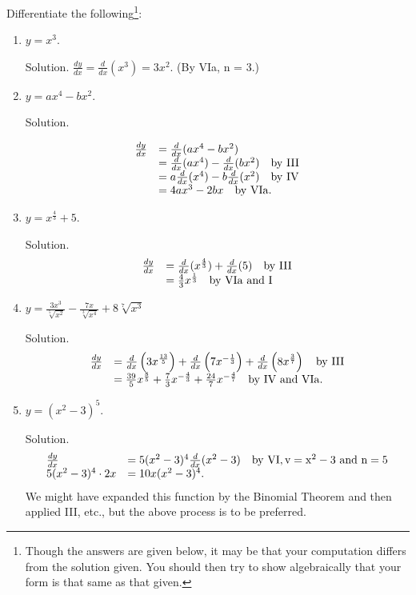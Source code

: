Differentiate the following\footnote{Though the answers are given 
below, it may be that your computation differs from the solution given.
You should then try to show algebraically that your form is that same 
as that given.}: %

\begin{enumerate}
\item
$y = x^3$.

Solution. $\frac{dy}{dx} = \frac{d}{dx}(x^3) = 3x^2$. 
(By VIa, n = 3.)

\item
$y = ax^4 - bx^2$.

Solution. 

\[
\begin{array}{ll}
\frac{dy}{dx} &	= \frac{d}{dx} (ax^4 - bx^2) \\
& = \frac{d}{dx} (ax^4) - \frac{d}{dx}( bx^2) \ \ \ {\rm	by\ III}\\
& = a\frac{d}{dx} (x^4) - b\frac{d}{dx} (x^2)  \ \ \ {\rm by\ IV}\\
 & = 4ax^3 - 2bx  \ \ \ {\rm by\ VIa}. 
\end{array}
\]

\item
$y = x^{\frac{4}{3}} + 5$.

Solution. 
\[
\begin{array}{ll}
\frac{dy}{dx} &	= \frac{d}{dx}(x^{\frac{4}{3}}) + \frac{d}{dx}(5) \ \ \ {\rm by\ III}\\
  &	= \frac{4}{3} x^{\frac{1}{3}}  \ \ \ {\rm by\  VIa\ and\ I}
\end{array}
\]


\item
$y = \frac{3x^3}{\sqrt[5]{x^2}} - \frac{7x}{\sqrt[3]{x^4}} + 8\sqrt[7]{x^3}$

Solution. 
\[
\begin{array}{ll}
\frac{dy}{dx} &	= \frac{d}{dx} \left ( 3 x^{\frac{13}{5}} \right ) 
+ \frac{d}{dx} \left ( 7 x^{-\frac{1}{3}} \right ) 
+ \frac{d}{dx} \left ( 8 x^{\frac{3}{7}} \right )   \ \ \ {\rm	by\ III}\\
&  	= \frac{39}{5} x^{\frac{8}{5}} + \frac{7}{3} x^{-\frac{4}{3}} + \frac{24}{7} x^{-\frac{4}{7}}
  \ \ \ {\rm	by\  IV\ and\ VIa}.
\end{array}
\]

\item
$y = (x^2 - 3)^5$.

Solution. 
\[
\begin{array}{ll}
\frac{dy}{dx} &=5 (x^2 - 3)^4 \frac{d}{dx} (x^2 - 3)   \ \ \ {\rm	by\ VI,
v = x^2 - 3 \ {\rm  and\ } n = 5}\\
  	5(x^2 - 3)^4 \cdot 2x & = 10x(x^2 - 3)^4. 
\end{array}
\]
We might have expanded this function by the Binomial Theorem 
and then applied III, etc., but the above process is to be preferred.


\end{enumerate}
